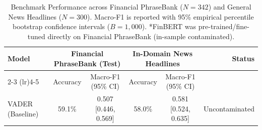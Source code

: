 \begin{table}[t]
\centering
\small
\caption{Benchmark Performance across Financial PhraseBank ($N=342$) and General News Headlines ($N=300$). Macro-F1 is reported with 95\% empirical percentile bootstrap confidence intervals ($B=1,000$). *FinBERT was pre-trained/fine-tuned directly on Financial PhraseBank (in-sample contaminated).}
\label{tab:benchmark}
\begin{tabular}{lccccr}
\toprule
\textbf{Model} & \multicolumn{2}{c}{\textbf{Financial PhraseBank (Test)}} & \multicolumn{2}{c}{\textbf{In-Domain News Headlines}} & \textbf{Status} \\
\cmidrule(lr){2-3} \cmidrule(lr){4-5}
& Accuracy & Macro-F1 (95\% CI) & Accuracy & Macro-F1 (95\% CI) & \\
\midrule
VADER (Baseline) & 59.1\% & 0.507 [0.446, 0.569] & 58.0\% & 0.581 [0.524, 0.635] & Uncontaminated \\
\bottomrule
\end{tabular}
\end{table}